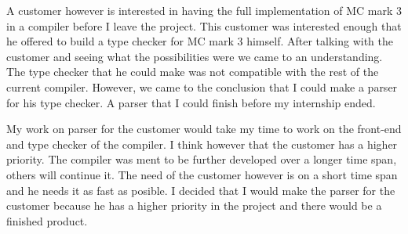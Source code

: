 A customer however is interested in having the full implementation of MC mark 3 in a compiler before I leave the project. This customer was interested enough that he offered to build a type checker for MC mark 3 himself. After talking with the customer and seeing what the possibilities were we came to an understanding. The type checker that he could make was not compatible with the rest of the current compiler. However, we came to the conclusion that I could make a parser for his type checker. A parser that I could finish before my internship ended.

My work on parser for the customer would take my time to work on the front-end and type checker of the compiler. I think however that the customer has a higher priority. The compiler was ment to be further developed over a longer time span, others will continue it. The need of the customer however is on a short time span and he needs it as fast as posible. 
I decided that I would make the parser for the customer because he has a higher priority in the project and there would be a finished product.









